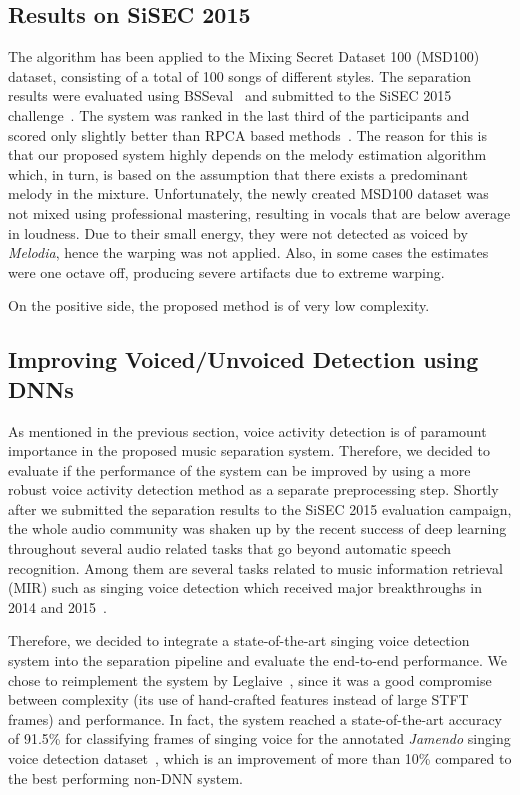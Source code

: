 \subsection{Results on SiSEC 2015}
\label{ssec:performance_sisec15}

The algorithm has been applied to the Mixing Secret Dataset 100 (MSD100) dataset, consisting of a total of 100 songs of different styles.
The separation results were evaluated using BSSeval~\cite{fevotte05} and submitted to the \acs{SiSEC} 2015 challenge~\cite{ono15}.
The system was ranked in the last third of the participants and scored only slightly better than RPCA based methods~\cite{huang12}.
The reason for this is that our proposed system highly depends on the melody estimation algorithm which, in turn, is based on the assumption that there exists a predominant melody in the mixture.
Unfortunately, the newly created MSD100 dataset was not mixed using professional mastering, resulting in vocals that are below average in loudness.
Due to their small energy, they were not detected as voiced by \emph{Melodia}, hence the warping was not applied. Also, in some cases the estimates were one octave off, producing severe artifacts due to extreme warping.\par
On the positive side, the proposed method is of very low complexity.

\subsection{Improving Voiced/Unvoiced Detection using DNNs}

As mentioned in the previous section, voice activity detection is of paramount importance in the proposed music separation system.
Therefore, we decided to evaluate if the performance of the system can be improved by using a more robust voice activity detection method as a separate preprocessing step.
Shortly after we submitted the separation results to the \acs{SiSEC} 2015 evaluation campaign, the whole audio community was shaken up by the recent success of deep learning throughout several audio related tasks that go beyond automatic speech recognition.
Among them are several tasks related to music information retrieval (MIR) such as singing voice detection which received major breakthroughs in 2014 and 2015~\cite{lehner14, lehner15, Leglaive15, schlueter15}.
\par
Therefore, we decided to integrate a state-of-the-art singing voice detection system into the separation pipeline and evaluate the end-to-end performance.
We chose to reimplement the system by Leglaive~\cite{Leglaive15}, since it was a good compromise between complexity (its use of hand-crafted features instead of large \acs{STFT} frames) and performance.
In fact, the system reached a state-of-the-art accuracy of 91.5\% for classifying frames of singing voice for the annotated \emph{Jamendo} singing voice detection dataset~\cite{ramona08}, which is an improvement of more than 10\% compared to the best performing non-DNN system.

